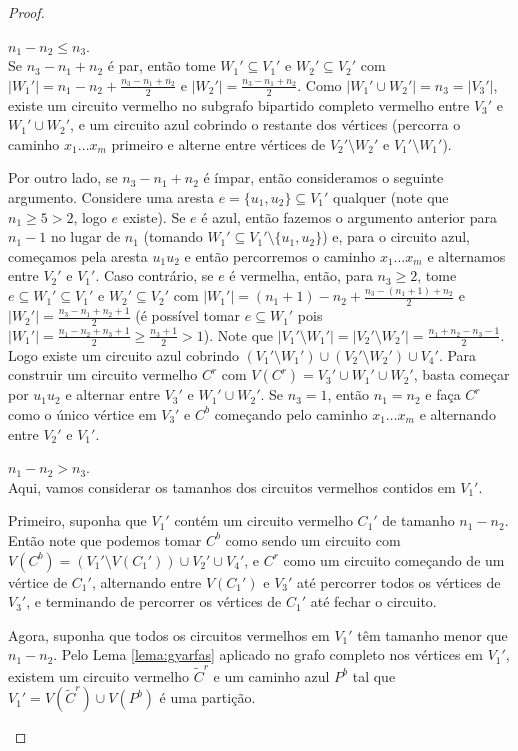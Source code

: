 \begin{proof}
	\begin{caso}
		$n_1 - n_2\leq n_3$.\\		
		Se $n_3 - n_1 + n_2$ é par, então tome $W_1'\subseteq V_1'$ e $W_2'\subseteq V_2'$ com $|W_1'| = n_1 - n_2 + \frac{n_3 - n_1 + n_2}{2}$ e $|W_2'| = \frac{n_3 - n_1 + n_2}{2}$. Como $|W_1'\cup W_2'| = n_3 = |V_3'|$, existe um circuito vermelho no subgrafo bipartido completo vermelho entre $V_3'$ e $W_1'\cup W_2'$, e um circuito azul cobrindo o restante dos vértices (percorra o caminho $x_1\dots x_m$ primeiro e alterne entre vértices de $V_2'\setminus W_2'$ e $V_1'\setminus W_1'$).
		
		Por outro lado, se $n_3 - n_1 + n_2$ é ímpar, então consideramos o seguinte argumento. Considere uma aresta $e = \{u_1, u_2\}\subseteq V_1'$ qualquer (note que $n_1\geq5>2$, logo $e$ existe). Se $e$ é azul, então fazemos o argumento anterior para $n_1-1$ no lugar de $n_1$ (tomando $W_1'\subseteq V_1'\setminus\{u_1, u_2\}$) e, para o circuito azul, começamos pela aresta $u_1u_2$ e então percorremos o caminho $x_1\dots x_m$ e alternamos entre $V_2'$ e $V_1'$.
		Caso contrário, se $e$ é vermelha, então, para $n_3\geq2$, tome $e\subseteq W_1'\subseteq V_1'$ e $W_2'\subseteq V_2'$ com $|W_1'| = (n_1 + 1) - n_2 + \frac{n_3 - (n_1+1) + n_2}{2}$ e $|W_2'| = \frac{n_3 - n_1 + n_2 + 1}{2}$ (é possível tomar $e\subseteq W_1'$ pois $|W_1'| = \frac{n_1 - n_2 + n_3 + 1}{2}\geq \frac{n_3 + 1}{2}>1$). Note que $|V_1'\setminus W_1'| = |V_2'\setminus W_2'| = \frac{n_1 + n_2 - n_3 - 1}{2}$. Logo existe um circuito azul cobrindo $(V_1'\setminus W_1')\cup(V_2'\setminus W_2')\cup V_4'$. Para construir um circuito vermelho $C^r$ com $V(C^r) = V_3'\cup W_1' \cup W_2'$, basta começar por $u_1u_2$ e alternar entre $V_3'$ e $W_1'\cup W_2'$. Se $n_3 = 1$, então $n_1 = n_2$ e faça $C^r$ como o único vértice em $V_3'$ e $C^b$ começando pelo caminho $x_1\dots x_m$ e alternando entre $V_2'$ e $V_1'$.
	\end{caso} 
	\begin{caso}
		$n_1 - n_2 > n_3$.\\
		Aqui, vamos considerar os tamanhos dos circuitos vermelhos contidos em $V_1'$.
		
		Primeiro, suponha que $V_1'$ contém um circuito vermelho $C_1'$ de tamanho $n_1 - n_2$. Então note que podemos tomar $C^b$ como sendo um circuito com $V(C^b) = (V_1'\setminus V(C_1'))\cup V_2'\cup V_4'$, e $C^r$ como um circuito começando de um vértice de $C_1'$, alternando entre $V(C_1')$ e $V_3'$ até percorrer todos os vértices de $V_3'$, e terminando de percorrer os vértices de $C_1'$ até fechar o circuito.
		
		Agora, suponha que todos os circuitos vermelhos em $V_1'$ têm tamanho menor que $n_1 - n_2$. Pelo Lema \ref{lema:gyarfas} aplicado no grafo completo nos vértices em $V_1'$, existem um circuito vermelho $\tilde{C}^r$ e um caminho azul $P^b$ tal que $V_1' = V(\tilde{C}^r)\cup V(P^b)$ é uma partição. 
	\end{caso}
\end{proof}

